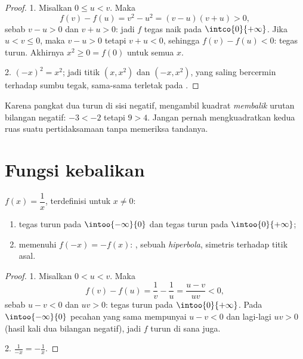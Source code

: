 \begin{proof}
1. Misalkan $0 \leq u < v$. Maka
\[
f(v) - f(u) = v^2 - u^2 = (v - u)(v + u) > 0,
\]
sebab $v - u > 0$ dan $v + u > 0$: jadi $f$ tegas naik pada
$\intco{0}{+\infty}$. Jika $u < v \leq 0$, maka $v - u > 0$ tetapi
$v + u < 0$, sehingga $f(v) - f(u) < 0$: tegas turun. Akhirnya
$x^2 \geq 0 = f(0)$ untuk semua $x$.

2. $(-x)^2 = x^2$; jadi titik $(x, x^2)$ dan $(-x, x^2)$, yang saling
bercermin terhadap sumbu tegak, sama-sama terletak pada .
\end{proof}

\begin{remark}
Karena  pangkat dua turun di sisi negatif, mengambil kuadrat
\emph{membalik} urutan bilangan negatif: $-3 < -2$ tetapi $9 > 4$.
Jangan pernah mengkuadratkan kedua ruas suatu pertidaksamaan tanpa memeriksa tandanya.
\end{remark}

\section{Fungsi kebalikan}

\begin{proposition}\label{prop:g10:reffunc:inverse}
 $f(x) = \dfrac1x$, terdefinisi untuk $x \neq 0$:
\begin{enumerate}
  \item tegas turun pada $\intoo{-\infty}{0}$ dan tegas
        turun pada $\intoo{0}{+\infty}$;
  \item memenuhi $f(-x) = -f(x)$: , sebuah
        \emph{hiperbola}, simetris terhadap titik asal.
\end{enumerate}
\end{proposition}

\begin{proof}
1. Misalkan $0 < u < v$. Maka
\[
f(v) - f(u) = \frac1v - \frac1u = \frac{u - v}{uv} < 0,
\]
sebab $u - v < 0$ dan $uv > 0$: tegas turun pada
$\intoo{0}{+\infty}$. Pada $\intoo{-\infty}{0}$ pecahan yang sama mempunyai
$u - v < 0$ dan lagi-lagi $uv > 0$ (hasil kali dua bilangan negatif), jadi $f$
turun di sana juga.

2. $\frac{1}{-x} = -\frac1x$.
\end{proof}

